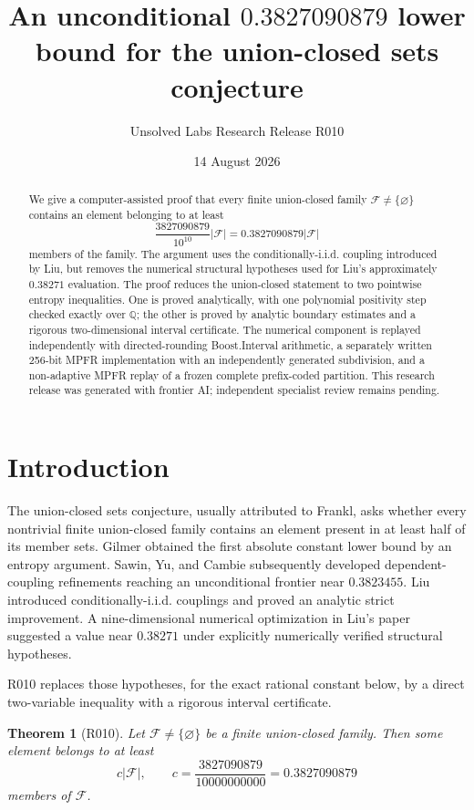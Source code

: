 \documentclass[11pt]{article}
\title{An unconditional $0.3827090879$ lower bound for the union-closed sets conjecture}
\author{Unsolved Labs Research Release R010}
\date{14 August 2026}
\newtheorem{theorem}{Theorem}
\newcommand{\F}{\mathcal F}
\begin{document}
\maketitle

\begin{abstract}
We give a computer-assisted proof that every finite union-closed family
$\F\neq\{\varnothing\}$ contains an element belonging to at least
\[
  \frac{3827090879}{10^{10}}|\F|=0.3827090879|\F|
\]
members of the family. The argument uses the conditionally-i.i.d. coupling
introduced by Liu, but removes the numerical structural hypotheses used for
Liu's approximately $0.38271$ evaluation. The proof reduces the union-closed
statement to two pointwise entropy inequalities. One is proved analytically,
with one polynomial positivity step checked exactly over $\mathbb Q$; the
other is proved by analytic boundary estimates and a rigorous two-dimensional
interval certificate. The numerical component is replayed independently with
directed-rounding Boost.Interval arithmetic, a separately written 256-bit MPFR
implementation with an independently generated subdivision, and a non-adaptive
MPFR replay of a frozen complete prefix-coded partition. This research release
was generated with frontier AI; independent specialist review remains pending.
\end{abstract}

\section{Introduction}

The union-closed sets conjecture, usually attributed to Frankl, asks whether
every nontrivial finite union-closed family contains an element present in at
least half of its member sets. Gilmer obtained the first absolute constant
lower bound by an entropy argument. Sawin, Yu, and Cambie subsequently
developed dependent-coupling refinements reaching an unconditional frontier
near $0.3823455$. Liu introduced conditionally-i.i.d. couplings and proved an
analytic strict improvement. A nine-dimensional numerical optimization in
Liu's paper suggested a value near $0.38271$ under explicitly numerically
verified structural hypotheses.

R010 replaces those hypotheses, for the exact rational constant below, by a
direct two-variable inequality with a rigorous interval certificate.

\begin{theorem}[R010]\label{thm:main}
Let $\F\neq\{\varnothing\}$ be a finite union-closed family. Then some
element belongs to at least
\[
c|\F|,\qquad c=\frac{3827090879}{10000000000}=0.3827090879
\]
members of $\F$.
\end{theorem}
\end{document}
